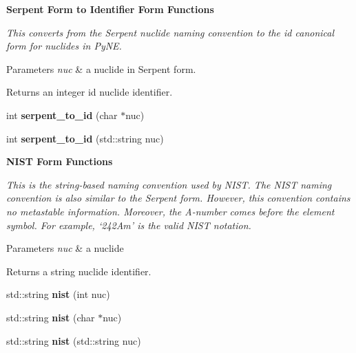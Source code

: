 \begin{Indent}{\bf Serpent Form to Identifier Form Functions}\par
{\em This converts from the Serpent nuclide naming convention to the id canonical form for nuclides in Py\-N\-E. 
\begin{DoxyParams}{Parameters}
{\em nuc} & a nuclide in Serpent form. \\
\hline
\end{DoxyParams}
\begin{DoxyReturn}{Returns}
an integer id nuclide identifier. 
\end{DoxyReturn}
}\begin{DoxyCompactItemize}
\item 
\hypertarget{namespacepyne_1_1nucname_a1be6b404ba5ab52cb51a8cfb91d2a771}{int {\bfseries serpent\-\_\-to\-\_\-id} (char $\ast$nuc)}\label{namespacepyne_1_1nucname_a1be6b404ba5ab52cb51a8cfb91d2a771}

\item 
\hypertarget{namespacepyne_1_1nucname_a23cb9b915047f2aac156e9c102f96fc7}{int {\bfseries serpent\-\_\-to\-\_\-id} (std\-::string nuc)}\label{namespacepyne_1_1nucname_a23cb9b915047f2aac156e9c102f96fc7}

\end{DoxyCompactItemize}
\end{Indent}
\begin{Indent}{\bf N\-I\-S\-T Form Functions}\par
{\em This is the string-\/based naming convention used by N\-I\-S\-T. The N\-I\-S\-T naming convention is also similar to the Serpent form. However, this convention contains no metastable information. Moreover, the A-\/number comes before the element symbol. For example, ‘242\-Am’ is the valid N\-I\-S\-T notation. 
\begin{DoxyParams}{Parameters}
{\em nuc} & a nuclide \\
\hline
\end{DoxyParams}
\begin{DoxyReturn}{Returns}
a string nuclide identifier. 
\end{DoxyReturn}
}\begin{DoxyCompactItemize}
\item 
\hypertarget{namespacepyne_1_1nucname_ab7a6f2f0459c253bc311fbbd62e00a38}{std\-::string {\bfseries nist} (int nuc)}\label{namespacepyne_1_1nucname_ab7a6f2f0459c253bc311fbbd62e00a38}

\item 
\hypertarget{namespacepyne_1_1nucname_aad9752957663fcaa432707c34d414659}{std\-::string {\bfseries nist} (char $\ast$nuc)}\label{namespacepyne_1_1nucname_aad9752957663fcaa432707c34d414659}

\item 
\hypertarget{namespacepyne_1_1nucname_aa4c79af1530cdae7db618209167d17da}{std\-::string {\bfseries nist} (std\-::string nuc)}\label{namespacepyne_1_1nucname_aa4c79af1530cdae7db618209167d17da}

\end{DoxyCompactItemize}
\end{Indent}
